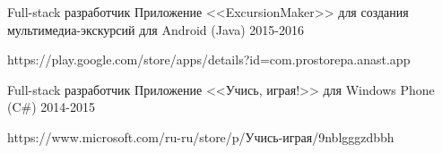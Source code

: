 \begin{cventries}

\cventry
{Full-stack разработчик} %
{Приложение <<ExcursionMaker>> для создания мультимедиа-экскурсий для Android (Java)} %
{} %
{2015-2016} %
{ %
 \begin{cvitems}
\item {https://play.google.com/store/apps/details?id=com.prostorepa.anast.app}
 \end{cvitems}
}


\cventry
{Full-stack разработчик} %
{Приложение <<Учись, играя!>> для Windows Phone (C\#)} %
{} %
{2014-2015} %
{ %
 \begin{cvitems}
\item {https://www.microsoft.com/ru-ru/store/p/Учись-играя/9nblgggzdbbh}
 \end{cvitems}
}

\end{cventries}